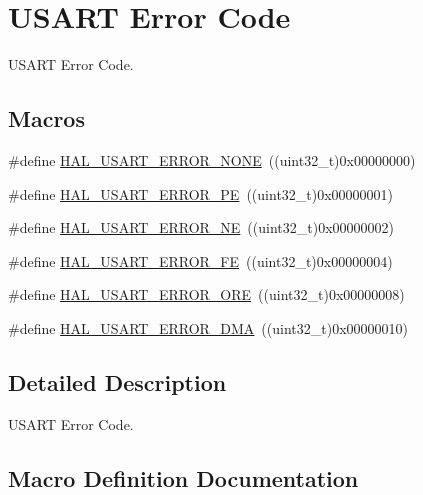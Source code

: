 \hypertarget{group___u_s_a_r_t___error___code}{}\section{U\+S\+A\+RT Error Code}
\label{group___u_s_a_r_t___error___code}


U\+S\+A\+RT Error Code.  


\subsection*{Macros}
\begin{DoxyCompactItemize}
\item 
\#define \hyperlink{group___u_s_a_r_t___error___code_ga17532bdd4160fffddb630e7c8bcbb2f6}{H\+A\+L\+\_\+\+U\+S\+A\+R\+T\+\_\+\+E\+R\+R\+O\+R\+\_\+\+N\+O\+NE}~((uint32\+\_\+t)0x00000000)
\item 
\#define \hyperlink{group___u_s_a_r_t___error___code_ga269cd569ad4cdd7f71fb981a4ab1f798}{H\+A\+L\+\_\+\+U\+S\+A\+R\+T\+\_\+\+E\+R\+R\+O\+R\+\_\+\+PE}~((uint32\+\_\+t)0x00000001)
\item 
\#define \hyperlink{group___u_s_a_r_t___error___code_ga249f36e7ac22c4f4bce2f4ab8b8341a4}{H\+A\+L\+\_\+\+U\+S\+A\+R\+T\+\_\+\+E\+R\+R\+O\+R\+\_\+\+NE}~((uint32\+\_\+t)0x00000002)
\item 
\#define \hyperlink{group___u_s_a_r_t___error___code_ga34fc0a7c8c2485f49c12d86c731d4a8b}{H\+A\+L\+\_\+\+U\+S\+A\+R\+T\+\_\+\+E\+R\+R\+O\+R\+\_\+\+FE}~((uint32\+\_\+t)0x00000004)
\item 
\#define \hyperlink{group___u_s_a_r_t___error___code_gae9a3360202080eefcffba1defac9e2a9}{H\+A\+L\+\_\+\+U\+S\+A\+R\+T\+\_\+\+E\+R\+R\+O\+R\+\_\+\+O\+RE}~((uint32\+\_\+t)0x00000008)
\item 
\#define \hyperlink{group___u_s_a_r_t___error___code_ga49cb372d5bf22d7de63b4ab1579a3527}{H\+A\+L\+\_\+\+U\+S\+A\+R\+T\+\_\+\+E\+R\+R\+O\+R\+\_\+\+D\+MA}~((uint32\+\_\+t)0x00000010)
\end{DoxyCompactItemize}


\subsection{Detailed Description}
U\+S\+A\+RT Error Code. 



\subsection{Macro Definition Documentation}
